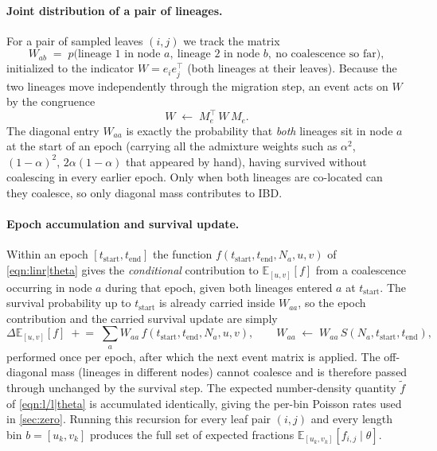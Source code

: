 \documentclass[12pt]{article}
\theoremstyle{definition}
\theoremstyle{definition}
\theoremstyle{lemma}
\theoremstyle{remark}
\theoremstyle{definition}
\begin{document}
\paragraph{Joint distribution of a pair of lineages.}
For a pair of sampled leaves $(i,j)$ we track the matrix
\[
  W_{ab} \;=\; p\big(\text{lineage 1 in node }a,\ \text{lineage 2 in node }b,\ \text{no coalescence so far}\big),
\]
initialized to the indicator $W=e_i e_j^\top$ (both lineages at their leaves).
Because the two lineages move independently through the migration step, an event
acts on $W$ by the congruence
\[
  W \;\leftarrow\; M_e^\top\, W\, M_e .
\]
The diagonal entry $W_{aa}$ is exactly the probability that \emph{both} lineages
sit in node $a$ at the start of an epoch (carrying all the admixture weights such
as $\alpha^2$, $(1-\alpha)^2$, $2\alpha(1-\alpha)$ that appeared by hand), having
survived without coalescing in every earlier epoch. Only when both lineages are
co-located can they coalesce, so only diagonal mass contributes to IBD.

\paragraph{Epoch accumulation and survival update.}
Within an epoch $[t_{\text{start}}, t_{\text{end}}]$ the function
$f(t_{\text{start}},t_{\text{end}},N_a,u,v)$ of \cref{eqn:linr|theta} gives the
\emph{conditional} contribution to $\mathbb{E}_{[u,v]}[f]$ from a coalescence
occurring in node $a$ during that epoch, given both lineages entered $a$ at
$t_{\text{start}}$. The survival probability up to $t_{\text{start}}$ is already
carried inside $W_{aa}$, so the epoch contribution and the carried survival
update are simply
\[
  \Delta\mathbb{E}_{[u,v]}[f]\;\mathrel{+}=\;\sum_{a} W_{aa}\,
  f(t_{\text{start}},t_{\text{end}},N_a,u,v),
  \qquad
  W_{aa}\;\leftarrow\; W_{aa}\,S(N_a,t_{\text{start}},t_{\text{end}}),
\]
performed once per epoch, after which the next event matrix is applied. The
off-diagonal mass (lineages in different nodes) cannot coalesce and is therefore
passed through unchanged by the survival step. The expected number-density
quantity $\tilde f$ of \cref{eqn:l/l|theta} is accumulated identically, giving the
per-bin Poisson rates used in \cref{sec:zero}. Running this recursion for every
leaf pair $(i,j)$ and every length bin $b=[u_k,v_k]$ produces the full set of
expected fractions $\mathbb{E}_{[u_k,v_k]}[f_{i,j}\mid\theta]$.
\end{document}
